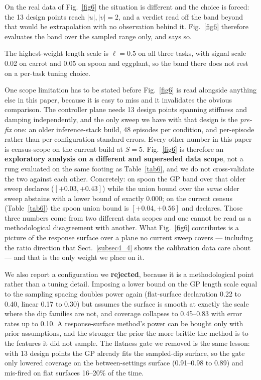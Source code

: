 \documentclass[pdflatex,iicol,sn-apa]{sn-jnl}
\theoremstyle{remark}
\begin{document}
On the real data of Fig.~\ref{fig6} the situation is different and the choice is forced: the 13
design points reach $|u|, |v| = 2$, and a verdict read off the band beyond that would be
extrapolation with no observation behind it. Fig.~\ref{fig6} therefore evaluates the band over the
sampled range only, and says so.

The highest-weight length scale is $\ell = 0.5$ on all three tasks, with signal scale 0.02 on carrot
and 0.05 on spoon and eggplant, so the band there does not rest on a per-task tuning choice.

One scope limitation has to be stated before Fig.~\ref{fig6} is read alongside anything else in this
paper, because it is easy to miss and it invalidates the obvious comparison. The controller plane
needs 13 design points spanning stiffness and damping independently, and the only sweep we have with
that design is the \emph{pre-fix} one: an older inference-stack build, 48 episodes per condition, and
per-episode rather than per-configuration standard errors. Every other number in this paper is
census-scope on the current build at $S = 5$. Fig.~\ref{fig6} is therefore an \textbf{exploratory
analysis on a different and superseded data scope}, not a rung evaluated on the same footing as
Table~\ref{tab6}, and we do not cross-validate the two against each other. Concretely: on spoon the
GP band over that older sweep declares ($[+0.03, +0.43]$) while the union bound over the \emph{same}
older sweep abstains with a lower bound of exactly $0.000$; on the current census
(Table~\ref{tab6}) the spoon union bound is $[+0.04, +0.56]$ and declares. Those three numbers come
from two different data scopes and one cannot be read as a methodological disagreement with another.
What Fig.~\ref{fig6} contributes is a picture of the response surface over a plane no current sweep
covers --- including the ratio direction that Sect.~\ref{subsec4_4} shows the calibration data care
about --- and that is the only weight we place on it.

We also report a configuration we \textbf{rejected}, because it is a methodological point rather
than a tuning detail. Imposing a lower bound on the GP length scale equal to the sampling spacing
doubles power again (flat-surface declaration 0.22 to 0.40, linear 0.17 to 0.30) but assumes the
surface is smooth at exactly the scale where the dip families are not, and coverage collapses to
0.45--0.83 with error rates up to 0.10. A response-surface method's power can be bought only with
prior assumptions, and the stronger the prior the more brittle the method is to the features it did
not sample. The flatness gate we removed is the same lesson: with 13 design points the GP already
fits the sampled-dip surface, so the gate only lowered coverage on the between-settings surface
(0.91--0.98 to 0.89) and mis-fired on flat surfaces 16--20\% of the time.
\end{document}
